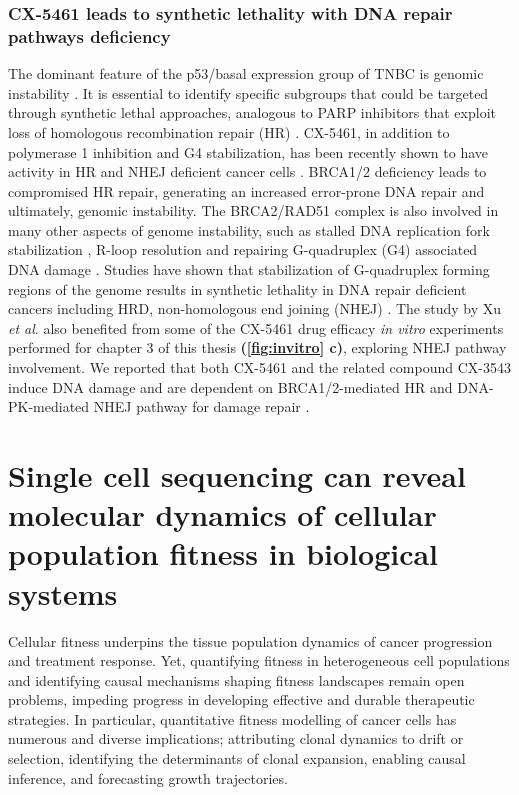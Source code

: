  
 \subsubsection{CX-5461 leads to synthetic lethality with  DNA repair pathways deficiency}
 The dominant feature of the p53/basal expression group of TNBC is genomic instability \cite{yu2013identification}. It is essential to identify specific subgroups that could be targeted through synthetic lethal approaches, analogous to PARP inhibitors that exploit loss of homologous recombination repair (HR) \cite{fong2009inhibition}.
 CX-5461, in addition to polymerase 1 inhibition and G4 stabilization, has been recently shown to have activity in \ac{HR} and \ac{NHEJ} deficient cancer cells \cite{zimmer2016targeting,xu2017cx}. 
 BRCA1/2 deficiency leads to compromised HR repair, generating an increased error-prone DNA repair and ultimately, genomic instability. The BRCA2/RAD51 complex is also involved in many other aspects of genome instability, such as stalled DNA replication fork stabilization \cite{schlacher2011double}, R-loop resolution \cite{bhatia2014brca2} and repairing G-quadruplex (G4) associated DNA damage .
 Studies have shown that stabilization of G-quadruplex forming regions of the genome results in synthetic lethality in DNA repair deficient cancers including HRD, non-homologous end joining (NHEJ) \cite{xu2017cx, mcluckie2013g, zimmer2016targeting}. 
The study by Xu \textit{et al}. also benefited from some of the CX-5461 drug efficacy \textit{in vitro} experiments performed for chapter 3 of this thesis \textbf{(\autoref{fig:invitro} c)}, exploring \ac{NHEJ} pathway involvement.  
We reported that both CX-5461 and the related compound CX-3543 induce DNA damage and are dependent on BRCA1/2-mediated HR and DNA-PK-mediated NHEJ pathway for damage repair \cite{xu2017cx}.


\section{Single cell sequencing can reveal molecular dynamics of cellular population fitness in biological systems}
Cellular fitness underpins the tissue population dynamics of cancer progression and treatment response. Yet, quantifying fitness in heterogeneous cell populations and identifying causal mechanisms shaping fitness landscapes remain open problems, impeding progress in developing effective and durable therapeutic strategies. In particular, quantitative fitness modelling of cancer cells has numerous and diverse implications; attributing clonal dynamics to drift or selection, identifying the determinants of clonal expansion, enabling causal inference, and forecasting growth trajectories. 

